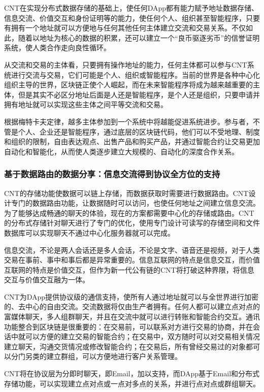 \documentclass[a4paper,12pt]{article}
\begin{document}
CNT在实现分布式数据存储的基础上，使任何DApp都有能力赋予地址数据存储、信息交流、价值交互和身份证明等的能力，使任何个人、组织甚至智能程序，只要有拥有一个地址就可以方便地与任何其他任何主体建立交流和交易关系。不仅如此，随着以地址为核心的数据的积累，还可以建立一个“良币驱逐劣币”的信誉证明系统，使人类合作走向良性循环。

从交流和交易的主体看，只要拥有操作地址的能力，任何主体都可以参与CNT系统进行交流与交易，它们可能是个人、组织或智能程序。当前的世界是各种中心化组织主导的世界，区块链正使个人崛起，而在未来智能程序将成为越来越重要的主体，但是其实不必区分地址后面是人还是智能程序，是个人还是组织，只要申请并拥有地址就可以实现这些主体之间平等交流和交易。

根据梅特卡夫定律，越多主体参加到一个系统中将越能促进系统进步。参与者，不管是个人、企业还是智能程序，通过底层的区块链代码，他们可以不受地理、制度和组织的限制，自由表达观点、出售产品和购买产品，并通过智能合约让交易更加自动化和智能化，从而使人类逐步建立大规模的、自动化的深度合作关系。

\subsubsection{基于数据路由的数据分享：信息交流得到协议全方位的支持}

CNT的存储功能使数据可以链上存储，而数据获取时需要进行数据路由。CNT设计专门的数据路由功能，让数据随时可以访问，也使任何地址之间建立信息交流。为了能够达成畅通的聊天的体验，现在的方案都需要中心化的存储或路由。CNT的分布式存储针对聊天进行了专门的优化，使用专门设计可读写的存储空间和文件数据库可以实现聊天不通过中心化服务器就可以完成。

信息交流，不论是两人会话还是多人会话，不论是文字、语音还是视频，对于人类交易在事前、事中和事后都是异常重要的。信息互联网的特点是信息交互，而价值互联网的特点是价值交互，但作为新一代公有链的CNT将打破这种界限，将信息交互与价值交互融为一体。

CNT为DApp提供协议级的通信支持，使所有人通过地址就可以与全世界进行加密的、去中心的自由交流。交流数据将仅由生产者拥有。任何人都可以建立点对点的富媒体聊天，多人组群聊天，并且在交流中就可以进行转账和智能合约交互。通讯功能整合到区块链是很重要的：在交易前，可以联系对方进行交易的协商，并在会话中就可以方便的建立交易的智能合约；在交易中，双方随时可以对交易相关情况建立聊天，沟通交货情况或修改智能合约；在交易后，所有曾经交易过的对象都可以分门另类的建立群组，可以方便地进行客户关系管理。

CNT将在协议层为分即时聊天，即Email，加以支持，而DApp基于Email和分布式存储功能，可以实现建立点对点或一点对多点的关系，并进行点对点或群组聊天。
\end{document}
